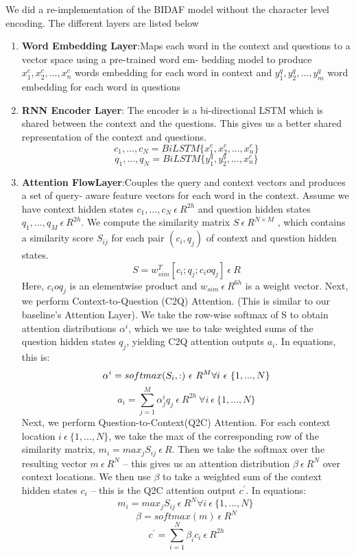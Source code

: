 \documentclass{article} %
\begin{document}
We did a re-implementation of the BIDAF model without the character level encoding. The different layers are listed below
\begin{enumerate}
\item \textbf{Word Embedding Layer}:Maps each word in the context and questions to a vector space using a pre-trained word em- bedding model to produce \( x^{c}_{1} , x^{c}_{2} , . . . , x^{c}_{n} \)  words embedding for each word in  context and \(y^{q}_{1} , y^{q}_{2} , . . . , y^{q}_{m} \) word embedding for each word in questions
\item \textbf{RNN Encoder Layer}: The encoder is a bi-directional LSTM which is shared between the context and the questions. This gives us a better shared representation of the context and questions.
            $${c_1, . . . , c_N} = BiLSTM \{ x^{c}_{1} , x^{c}_{2} , . . . , x^{c}_{n}\} $$
            $${q_1, . . . , q_N} = BiLSTM \{ y^{q}_{1} , y^{q}_{2} , . . . , x^{c}_{n}\} $$

\item \textbf{Attention FlowLayer}:Couples the query and context vectors and produces a set of query- aware feature vectors for each word in the context.
Assume we have context hidden states $c_1, . . . , c_N \ \epsilon \  R^{2h} $ and question hidden states $q_1, . . . , q_M \ \epsilon \  R^{2h} $. We compute the similarity matrix $ S \ \epsilon \  R^{N\times M}$ , which contains a similarity score $S_{ij}$ for each pair $(c_i,q_j)$ of context and question hidden states.
$$S =w^{T}_{sim}[c_{i};q_{j};c_{i} o q_{j}]\ \epsilon \ R $$
Here, $c_{i} o q_{j} $ is an elementwise product and $ w_{sim} \ \epsilon \ R^{6h} $ is a weight vector.
Next, we perform Context-to-Question (C2Q) Attention. (This is similar to our baseline’s Attention Layer). We take the row-wise softmax of S to obtain attention distributions $ \alpha^i$, which we use to take weighted sums of the question hidden states $q_j$, yielding C2Q attention outputs $a_i$.
In equations, this is:
$$\alpha^i = softmax(S_i,:)\ \epsilon \ R^{M} \\     \forall i \ \epsilon \ \{1,...,N\} $$
$$a_i =  \sum_{j=1}^{M}\alpha^{i}_{j}q_j \ \epsilon \ R^{2h} \   \forall i\ \epsilon \ \{1,...,N \}$$
Next, we perform Question-to-Context(Q2C) Attention. For each context location $i\ \epsilon \ \{1,...,N \}$, we take the max of the corresponding row of the similarity matrix, $m_{i} = max_{j} S_{ij} \ \epsilon \ R$. Then we take the softmax over the resulting vector $m \ \epsilon \ R^{N} $ – this gives us an attention distribution $\beta \ \epsilon \ R^{N}$ over context locations. We then use $\beta$ to take a weighted sum of the context hidden states $c_{i}$ – this is the Q2C attention output $c^{'}$. In equations:
$$ m_{i} = max_{j}S_{ij} \ \epsilon \ R^{N} \forall i \ \epsilon \ \{1,...,N\}\ $$
$$ \beta = softmax(m)\ \epsilon \ R^N $$
$$c^{'} = \sum_{i=1}^{N}\beta_{i}c_{i} \ \epsilon \ R^{2h} $$


\end{enumerate}
\end{document}
